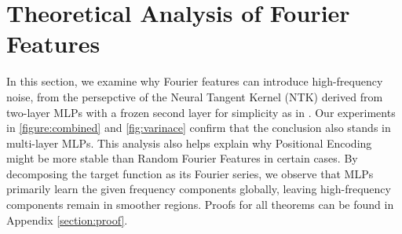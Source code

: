 \section{Theoretical Analysis of Fourier Features}
In this section, we examine why Fourier features can introduce high-frequency noise, from the persepctive of the Neural Tangent Kernel (NTK) derived from two-layer MLPs with a frozen second layer for simplicity as in \citet{arora2019fine}. Our experiments in \autoref{figure:combined} and \autoref{fig:varinace} confirm that the conclusion also stands in multi-layer MLPs.
%
This analysis also helps explain why Positional Encoding might be more stable than Random Fourier Features in certain cases. By decomposing the target function as its Fourier series, we observe that MLPs primarily learn the given frequency components globally, leaving high-frequency components remain in smoother regions. Proofs for all theorems can be found in Appendix \ref{section:proof}.

